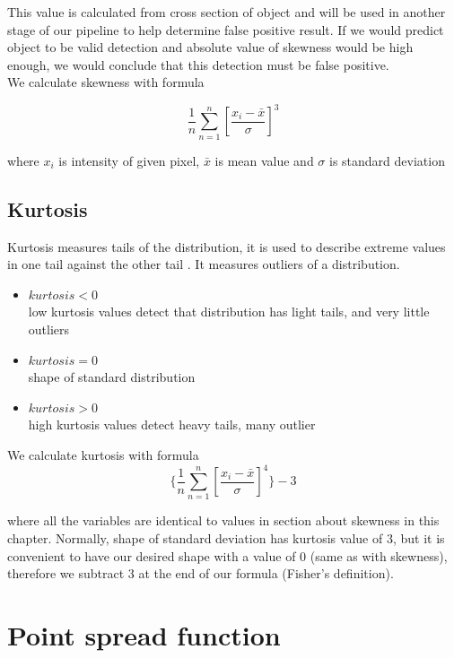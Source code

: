 \documentclass[12pt, a4paper, oneside]{book}
\begin{document}
This value is calculated from cross section of object and will be used in another stage of our pipeline to help determine false positive result.
If we would predict object to be valid detection and absolute value of skewness would be high enough, we would conclude that this detection must be false positive.\\
We calculate skewness with formula

$$\frac{1}{n} \sum_{n=1}^{n} [ \frac{x_i - \bar{x}}{\sigma} ]^3$$

        where $x_i$ is intensity of given pixel, $\bar{x}$ is mean value and $\sigma$ is standard deviation

\subsection{Kurtosis}
Kurtosis measures tails of the distribution, it is used to describe extreme values in one tail against the other tail \cite{numerical_recipes}.
It measures outliers of a distribution.

\begin{itemize}
    \item $kurtosis < 0$ \\
        low kurtosis values detect that distribution has light tails, and very little outliers
    \item $kurtosis = 0$ \\
        shape of standard distribution
    \item $kurtosis > 0$ \\
        high kurtosis values detect heavy tails, many outlier
\end{itemize}

We calculate kurtosis with formula
$$\{\frac{1}{n} \sum_{n=1}^{n} [ \frac{x_i - \bar{x}}{\sigma} ]^4\}-3$$

where all the variables are identical to values in section about skewness in this chapter.
Normally, shape of standard deviation has kurtosis value of 3, but it is convenient to have our desired shape with a value of 0 (same as with skewness), therefore we subtract 3 at the end of our formula (Fisher's definition).

\section{Point spread function}
\end{document}
